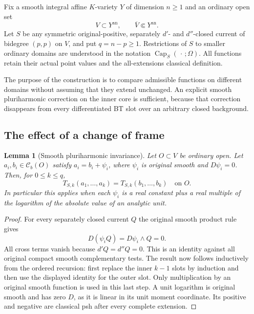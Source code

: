 \documentclass[11pt,a4paper]{article}
\numberwithin{equation}{section}
\newtheorem{lemma}[theorem]{Lemma}
\theoremstyle{definition}
\theoremstyle{remark}
\newcommand{\Cb}{\mathcal C_b}
\begin{document}
Fix a smooth integral affine $K$-variety $Y$ of dimension $n\geq1$
and an ordinary open set
\[
 V\subset Y^{\mathrm{an}},\qquad
                    \overline V\Subset Y^{\mathrm{an}}.
 \tag{D}\label{eq:r2-domain-comparison-scope}
\]
Let $S$ be any symmetric original-positive, separately $d'$- and
$d''$-closed current of bidegree $(p,p)$ on $V$, and put
$q=n-p\geq1$. Restrictions of $S$ to smaller ordinary domains are
understood in the notation $\operatorname{Cap}_S(\,\cdot\,;\Omega)$.
All functions retain their actual point values and the all-extensions
classical definition.

The purpose of the construction is to compare admissible functions
on different domains without assuming that they extend unchanged.
An explicit smooth pluriharmonic correction on the inner core is
sufficient, because that correction disappears from every
differentiated BT slot over an arbitrary closed background.

\subsection{The effect of a change of frame}

\begin{lemma}[Smooth pluriharmonic invariance]
\label{lem:r2-harmonic-frame-invariance}
Let $O\subset V$ be ordinary open. Let $a_i,b_i\in\Cb(O)$ satisfy
$a_i=b_i+\psi_i$, where $\psi_i$ is original smooth and
$D\psi_i=0$. Then, for $0\leq k\leq q$,
\[
 T_{S,k}(a_1,\ldots,a_k)=T_{S,k}(b_1,\ldots,b_k)
 \quad\text{on }O.
\]
In particular this applies when each $\psi_i$ is a real constant
plus a real multiple of the logarithm of the absolute value of an
analytic unit.
\end{lemma}

\begin{proof}
For every separately closed current $Q$ the original smooth product
rule gives
\[
 D(\psi_i Q)=D\psi_i\wedge Q=0.
\]
All cross terms vanish because $d'Q=d''Q=0$. This is an identity
against all original compact smooth complementary tests. The result
now follows inductively from the ordered recursion: first replace
the inner $k-1$ slots by induction and then use the displayed identity
for the outer slot. Only multiplication by an original smooth
function is used in this last step. A unit logarithm is original
smooth and has zero $D$, as it is linear in its unit moment
coordinate. Its positive and negative are classical psh after every
complete extension.
\end{proof}
\end{document}
